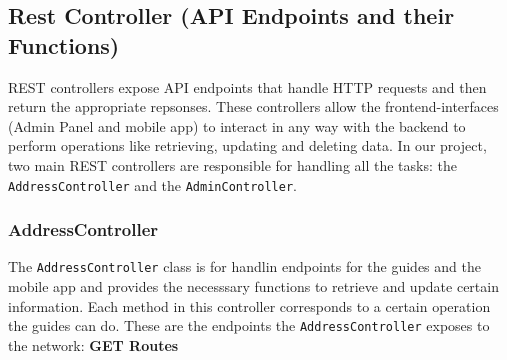     \subsection{Rest Controller (API Endpoints and their Functions)}

    REST controllers expose API endpoints that handle HTTP requests and then return the appropriate repsonses. These controllers allow the frontend-interfaces (Admin Panel and mobile app) to interact in any way with the backend to perform operations like retrieving, updating and deleting data. In our project, two main REST controllers are responsible for handling all the tasks: the \texttt{AddressController} and the \texttt{AdminController}.

    \subsubsection{AddressController}
    The \texttt{AddressController} class is for handlin endpoints for the guides and the mobile app and provides the necesssary functions to retrieve and update certain information. Each method in this controller corresponds to a certain operation the guides can do. These are the endpoints the \texttt{AddressController} exposes to the network: \newline \newline
    \textbf{GET Routes} 
